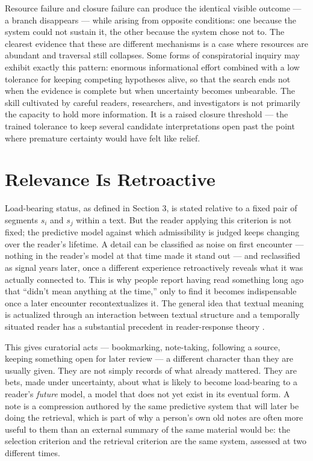 \documentclass[11pt]{article}
\begin{document}
Resource failure and closure failure can produce the identical visible outcome --- a branch disappears --- while arising from opposite conditions: one because the system could not sustain it, the other because the system chose not to. The clearest evidence that these are different mechanisms is a case where resources are abundant and traversal still collapses. Some forms of conspiratorial inquiry may exhibit exactly this pattern: enormous informational effort combined with a low tolerance for keeping competing hypotheses alive, so that the search ends not when the evidence is complete but when uncertainty becomes unbearable. The skill cultivated by careful readers, researchers, and investigators is not primarily the capacity to hold more information. It is a raised closure threshold --- the trained tolerance to keep several candidate interpretations open past the point where premature certainty would have felt like relief.

\section{Relevance Is Retroactive}

Load-bearing status, as defined in Section 3, is stated relative to a fixed pair of segments $s_i$ and $s_j$ within a text. But the reader applying this criterion is not fixed; the predictive model against which admissibility is judged keeps changing over the reader's lifetime. A detail can be classified as noise on first encounter --- nothing in the reader's model at that time made it stand out --- and reclassified as signal years later, once a different experience retroactively reveals what it was actually connected to. This is why people report having read something long ago that ``didn't mean anything at the time,'' only to find it becomes indispensable once a later encounter recontextualizes it. The general idea that textual meaning is actualized through an interaction between textual structure and a temporally situated reader has a substantial precedent in reader-response theory \citep{iser1978}.

This gives curatorial acts --- bookmarking, note-taking, following a source, keeping something open for later review --- a different character than they are usually given. They are not simply records of what already mattered. They are bets, made under uncertainty, about what is likely to become load-bearing to a reader's \emph{future} model, a model that does not yet exist in its eventual form. A note is a compression authored by the same predictive system that will later be doing the retrieval, which is part of why a person's own old notes are often more useful to them than an external summary of the same material would be: the selection criterion and the retrieval criterion are the same system, assessed at two different times.
\end{document}
